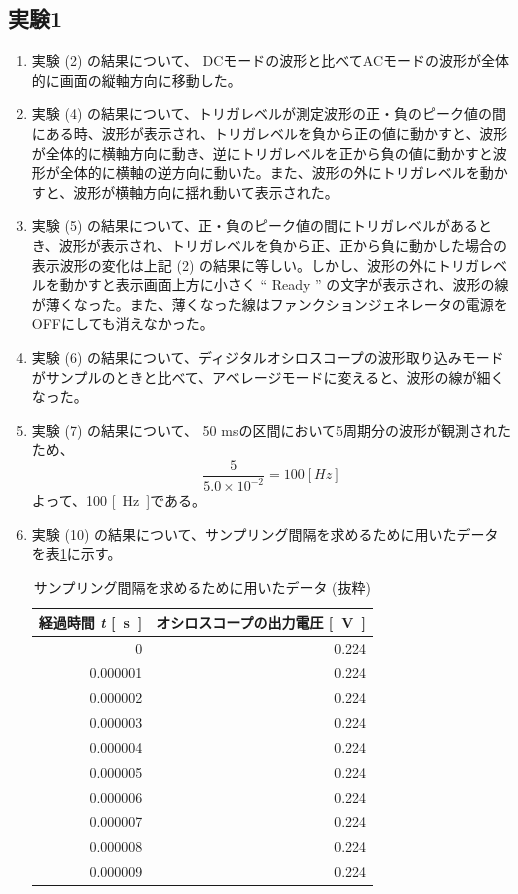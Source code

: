 \subsection{実験1}

\begin{enumerate}
  \setlength{\parskip}{0cm} %
  \setlength{\itemsep}{0cm} %
  \item 実験 (2) の結果について、 DCモードの波形と比べてACモードの波形が全体的に画面の縦軸方向に移動した。
  \item 実験 (4) の結果について、トリガレベルが測定波形の正・負のピーク値の間にある時、波形が表示され、トリガレベルを負から正の値に動かすと、波形が全体的に横軸方向に動き、逆にトリガレベルを正から負の値に動かすと波形が全体的に横軸の逆方向に動いた。また、波形の外にトリガレベルを動かすと、波形が横軸方向に揺れ動いて表示された。
  \item 実験 (5) の結果について、正・負のピーク値の間にトリガレベルがあるとき、波形が表示され、トリガレベルを負から正、正から負に動かした場合の表示波形の変化は上記 (2) の結果に等しい。しかし、波形の外にトリガレベルを動かすと表示画面上方に小さく “ Ready ” の文字が表示され、波形の線が薄くなった。また、薄くなった線はファンクションジェネレータの電源をOFFにしても消えなかった。
  \item 実験 (6) の結果について、ディジタルオシロスコープの波形取り込みモードがサンプルのときと比べて、アベレージモードに変えると、波形の線が細くなった。
  \item 実験 (7) の結果について、 50 msの区間において5周期分の波形が観測されたため、\\
  \begin{equation*}
    \frac{5}{5.0\times10^{-2}} = 100 \si{[Hz]}
  \end{equation*}
  よって、100 \si{[Hz]}である。
  \item 実験 (10) の結果について、サンプリング間隔を求めるために用いたデータを表\ref{tb2}に示す。
  \begin{table}[ht]
    \centering
    \caption{サンプリング間隔を求めるために用いたデータ (抜粋)}
    \begin{tabular}[t]{rr}
    \toprule
    \multicolumn{1}{c}{経過時間 \textit{t} \si{[s]}}&\multicolumn{1}{c}{オシロスコープの出力電圧 \si{[V]}}\\
    \midrule
    0&0.224\\
    0.000001&0.224\\
    0.000002&0.224\\
    0.000003&0.224\\
    0.000004&0.224\\
    0.000005&0.224\\
    0.000006&0.224\\
    0.000007&0.224\\
    0.000008&0.224\\
    0.000009&0.224\\
    \bottomrule
    \end{tabular}
    \label{tb2}
  \end{table}


\end{enumerate}
